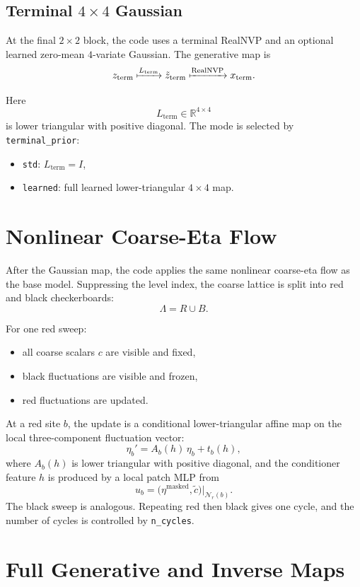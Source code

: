 \documentclass[11pt]{article}
\begin{document}
\subsection{Terminal $4 \times 4$ Gaussian}

At the final $2 \times 2$ block, the code uses a terminal RealNVP and an
optional learned zero-mean $4$-variate Gaussian. The generative map is
\[
z_{\mathrm{term}} \xmapsto{L_{\mathrm{term}}}
\tilde z_{\mathrm{term}} \xmapsto{\mathrm{RealNVP}}
x_{\mathrm{term}}.
\]

Here
\[
L_{\mathrm{term}} \in \mathbb{R}^{4 \times 4}
\]
is lower triangular with positive diagonal. The mode is selected by
\texttt{terminal\_prior}:
\begin{itemize}
\item \texttt{std}: $L_{\mathrm{term}} = I$,
\item \texttt{learned}: full learned lower-triangular $4 \times 4$ map.
\end{itemize}

\section{Nonlinear Coarse-Eta Flow}

After the Gaussian map, the code applies the same nonlinear coarse-eta flow as
the base model. Suppressing the level index, the coarse lattice is split into
red and black checkerboards:
\[
\Lambda = R \cup B.
\]

For one red sweep:
\begin{itemize}
\item all coarse scalars $c$ are visible and fixed,
\item black fluctuations are visible and frozen,
\item red fluctuations are updated.
\end{itemize}

At a red site $b$, the update is a conditional lower-triangular affine map on
the local three-component fluctuation vector:
\[
\eta_b' = A_b(h)\, \eta_b + t_b(h),
\]
where $A_b(h)$ is lower triangular with positive diagonal, and the conditioner
feature $h$ is produced by a local patch MLP from
\[
u_b = \bigl(\eta^{\mathrm{masked}}, \tilde c \bigr)\big|_{\mathcal N_r(b)}.
\]
The black sweep is analogous. Repeating red then black gives one cycle, and the
number of cycles is controlled by \texttt{n\_cycles}.

\section{Full Generative and Inverse Maps}
\end{document}
